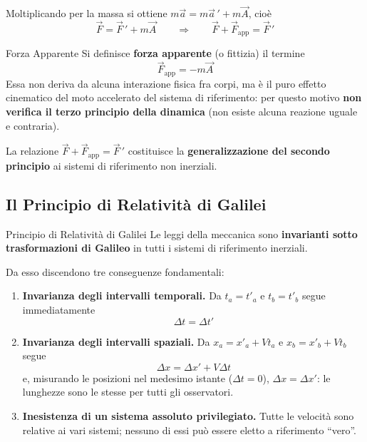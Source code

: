 Moltiplicando per la massa si ottiene $m\vec{a} = m\vec{a}\,' + m\vec{A}$, cioè
\begin{equation}
    \vec{F} = \vec{F}\,' + m\vec{A}
    \qquad \Longrightarrow \qquad
    \vec{F} + \vec{F}_{\text{app}} = \vec{F}\,'
\end{equation}

\begin{definizione}{Forza Apparente}
Si definisce \textbf{forza apparente} (o fittizia) il termine
\begin{equation}
    \vec{F}_{\text{app}} = -m\vec{A}
\end{equation}
Essa non deriva da alcuna interazione fisica fra corpi, ma è il puro effetto cinematico del moto accelerato del sistema di riferimento: per questo motivo \textbf{non verifica il terzo principio della dinamica} (non esiste alcuna reazione uguale e contraria).
\end{definizione}

La relazione $\vec{F} + \vec{F}_{\text{app}} = \vec{F}\,'$ costituisce la \textbf{generalizzazione del secondo principio} ai sistemi di riferimento non inerziali.

\subsection{Il Principio di Relatività di Galilei}

\begin{teorema}{Principio di Relatività di Galilei}
Le leggi della meccanica sono \textbf{invarianti sotto trasformazioni di Galileo} in tutti i sistemi di riferimento inerziali.
\end{teorema}

Da esso discendono tre conseguenze fondamentali:
\begin{enumerate}
    \item \textbf{Invarianza degli intervalli temporali.} Da $t_a = t'_a$ e $t_b = t'_b$ segue immediatamente
    \begin{equation}
        \Delta t = \Delta t'
    \end{equation}
    \item \textbf{Invarianza degli intervalli spaziali.} Da $x_a = x'_a + V t_a$ e $x_b = x'_b + V t_b$ segue
    \begin{equation}
        \Delta x = \Delta x' + V \Delta t
    \end{equation}
    e, misurando le posizioni nel medesimo istante ($\Delta t = 0$), $\Delta x = \Delta x'$: le lunghezze sono le stesse per tutti gli osservatori.
    \item \textbf{Inesistenza di un sistema assoluto privilegiato.} Tutte le velocità sono relative ai vari sistemi; nessuno di essi può essere eletto a riferimento ``vero''.
\end{enumerate}

